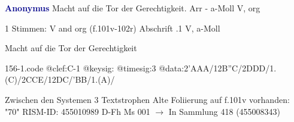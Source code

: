 \documentclass[twocolumn]{book}
\begin{document}
\newline \par \vspace{7pt} \textcolor{darkblue}{\textbf{Anonymus  }}
\newline Macht auf die Tor der Gerechtigkeit. Arr - a-Moll
\newline V, org
\newline \begin{itshape}\end{itshape} 
\newline \textcolor{darkblue}{}  1 Stimmen: V and org  (f.101v-102r)
\newline Abschrift
.1  V, a-Moll
\newline \begin{footnotesize} Macht auf die Tor der Gerechtigkeit \end{footnotesize}  
\begin{filecontents*}{156-1.code}
@clef:C-1
@keysig:
@timesig:3
@data:2'AAA/12B''C/2DDD/1.(C)/2CCE/12DC/'BB/1.(A)/
\end{filecontents*}
\newline
%
\newline Zwischen den Systemen 3 Textstrophen
\newline Alte Foliierung auf f.101v vorhanden: "70"
\newline RISM-ID: 455010989
\newline D-Fh  Ms 001
\newline $\rightarrow$ In Sammlung 418 (455008343)
      
\end{document}

